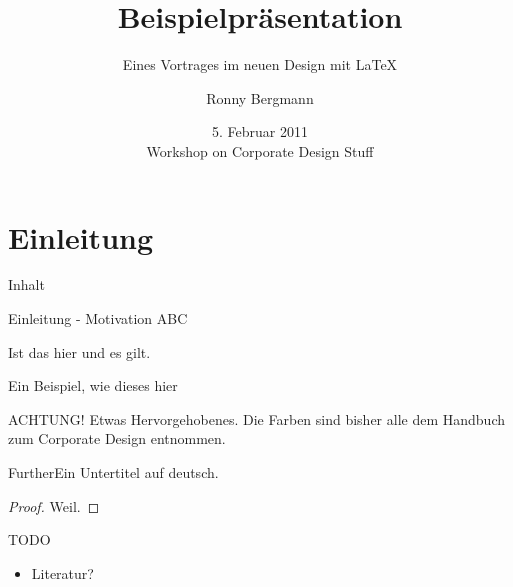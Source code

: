 \documentclass[german,10pt,xcolor=colortbl
]{beamer}
\title{Beispielpräsentation}
\subtitle{Eines Vortrages im neuen Design mit \LaTeX}
\date[]{5. Februar 2011\\[1ex] Workshop on Corporate Design Stuff}
\author[R. Bergmann]{Ronny Bergmann}
\institute[Universität zu Lübeck]{Institut für Mathematik\\Universität zu Lübeck}
\begin{document}
	\begin{frame}
		\titlepage
	\end{frame}
	
	\section{Einleitung}
	\begin{frame}{Inhalt}
		\tableofcontents%
	\end{frame}
	
	\begin{frame}{Einleitung - Motivation}
	ABC
	\begin{lemma}
		Ist das hier und es gilt.
	\end{lemma}
	\begin{example}
		Ein Beispiel, wie dieses hier
	\end{example}
	\alert{ACHTUNG!}
		Etwas Hervorgehobenes. Die Farben sind bisher alle dem Handbuch zum Corporate Design entnommen.
	\end{frame}
	\begin{frame}{Further}{Ein Untertitel auf deutsch.}
			\begin{proof}
				Weil.
			\end{proof}
	\end{frame}
	\begin{frame}{TODO}
		\begin{itemize}
			\item Literatur?
		\end{itemize}
	\end{frame}
\end{document}
